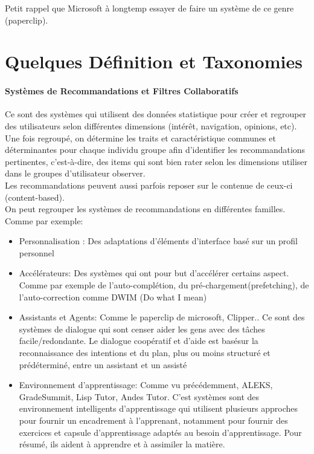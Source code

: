 \documentclass[oneside]{book}
\begin{document}
Petit rappel que Microsoft à longtemp essayer de faire un système de ce genre  (paperclip). 
\section{Quelques Définition et Taxonomies}
\paragraph{Systèmes de Recommandations et Filtres Collaboratifs}
Ce sont des systèmes qui utilisent des données statistique pour créer et regrouper des utilisateurs selon différentes dimensions (intérêt, navigation, opinions, etc). Une fois regroupé, on détermine les traits et caractéristique communes et déterminantes pour chaque individu groupe afin d'identifier les recommandations pertinentes, c'est-à-dire, des items qui sont bien rater selon les dimensions utiliser dans le groupes d'utilisateur observer.\\

Les recommandations peuvent aussi parfois reposer sur le contenue de ceux-ci (content-based). \\

On peut regrouper les systèmes de recommandations en différentes familles. Comme par exemple:
\begin{itemize}
\item Personnalisation : Des adaptations d'éléments d'interface basé sur un profil personnel
\item Accélérateurs: Des systèmes qui ont pour but d'accélérer certains aspect. Comme par exemple de l'auto-complétion, du pré-chargement(prefetching), de l'auto-correction comme DWIM (Do what I mean)
\item Assistants et Agents: Comme le paperclip de microsoft, Clipper.. Ce sont des systèmes de dialogue qui sont censer aider les gens avec des tâches facile/redondante. Le dialogue coopératif et d'aide est basésur la reconnaissance des intentions et du plan, plus ou moins structuré et prédéterminé, entre un assistant et un assisté

\item Environnement d'apprentissage: Comme vu précédemment, ALEKS, GradeSummit, Lisp Tutor, Andes Tutor. C'est systèmes sont des environnement intelligents d'apprentissage qui utilisent plusieurs approches pour fournir un encadrement à l'apprenant, notamment pour fournir des exercices et capsule d'apprentissage adaptés au besoin d'apprentissage. Pour résumé, ils aident à apprendre et à assimiler la matière.
\end{itemize}
\end{document}

